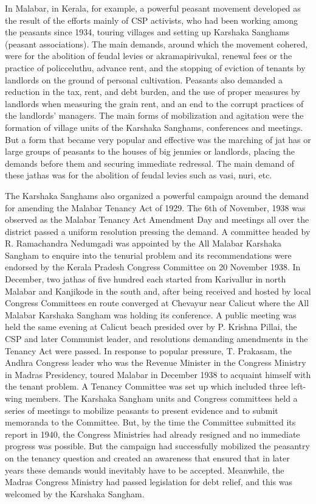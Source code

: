In Malabar, in Kerala, for example, a powerful peasant movement developed as the result of the efforts mainly of CSP activists, who had been working among the peasants since 1934, touring villages and setting up Karshaka Sanghams (peasant associations). The main demands, around which the movement cohered, were for the abolition of feudal levies or akramapirivukal, renewal fees or the practice of policceluthu, advance rent, and the stopping of eviction of tenants by landlords on the ground of personal cultivation. Peasants also demanded a reduction in the tax, rent, and debt burden, and the use of proper measures by landlords when measuring the grain rent, and an end to the corrupt practices of the landlords' managers. The main forms of mobilization and agitation were the formation of village units of the Karshaka Sanghams, conferences and meetings. But a form that became very popular and effective was the marching of jat has or large groups of peasants to the houses of big jenmies or landlords, placing the demands before them and securing immediate redressal. The main demand of these jathas was for the abolition of feudal levies such as vasi, nuri, etc.

The Karshaka Sanghams also organized a powerful campaign around the demand for amending the Malabar Tenancy Act of 1929. The 6th of November, 1938 was observed as the Malabar Tenancy Act Amendment Day and meetings all over the district passed a uniform resolution pressing the demand. A committee headed by R. Ramachandra Nedumgadi was appointed by the All Malabar Karshaka Sangham to enquire into the tenurial problem and its recommendations were endorsed by the Kerala Pradesh Congress Committee on 20 November 1938. In December, two jathas of five hundred each started from Karivallur in north Malabar and Kanjikode in the south and, after being received and hosted by local Congress Committees en route converged at Chevayur near Calicut where the All Malabar Karshaka Sangham was holding its conference. A public meeting was held the same evening at Calicut beach presided over by P. Krishna Pillai, the CSP and later Communist leader, and resolutions demanding amendments in the Tenancy Act were passed. In response to popular pressure, T. Prakasam, the Andhra Congress leader who was the Revenue Minister in the Congress Ministry in Madras Presidency, toured Malabar in December 1938 to acquaint himself with the tenant problem. A Tenancy Committee was set up which included three left-wing members. The Karshaka Sangham units and Congress committees held a series of meetings to mobilize peasants to present evidence and to submit memoranda to the Committee. But, by the time the Committee submitted its report in 1940, the Congress Ministries had already resigned and no immediate progress was possible. But the campaign had successfully mobilized the peasantry on the tenancy question and created an awareness that ensured that in later years these demands would inevitably have to be accepted. Meanwhile, the Madras Congress Ministry had passed legislation for debt relief, and this was welcomed by the Karshaka Sangham.

